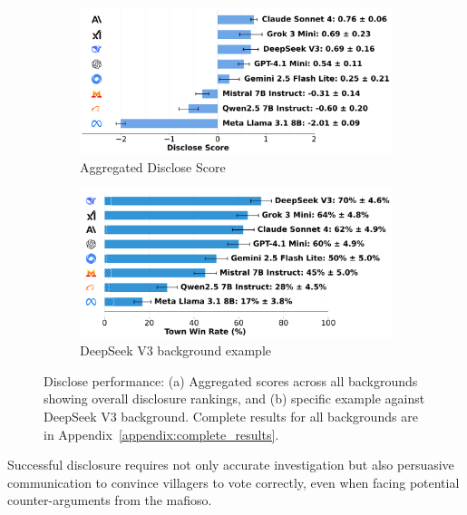 \documentclass{article}
\begin{document}
\begin{figure}[htbp]
    \centering
    \begin{subfigure}[b]{0.48\textwidth}
        \centering
        \includegraphics[width=\textwidth]{../results/detective_score_benchmark.png}
        \caption{Aggregated Disclose Score}
        \label{fig:disclose_score}
    \end{subfigure}
    \hfill
    \begin{subfigure}[b]{0.48\textwidth}
        \centering
        \includegraphics[width=\textwidth]{../results/detective_deepseek_v3_db_benchmark.png}
        \caption{DeepSeek V3 background example}
        \label{fig:disclose_deepseek_example}
    \end{subfigure}
    \caption{Disclose performance: (a) Aggregated scores across all backgrounds showing overall disclosure rankings, and (b) specific example against DeepSeek V3 background. Complete results for all backgrounds are in Appendix~\ref{appendix:complete_results}.}
    \label{fig:disclose_example}
\end{figure}

Successful disclosure requires not only accurate investigation but also persuasive communication to convince villagers to vote correctly, even when facing potential counter-arguments from the mafioso.
\end{document}
